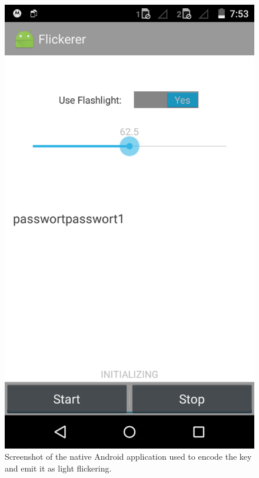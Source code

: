 \documentclass{sig-alternate} %
\begin{document}
\begin{figure}
	\centering
	\includegraphics[scale=.15]{images/screen_native.png}
	\caption{Screenshot of the native Android application used to encode the key and emit it as light flickering.}
	\label{fig:screenshot}
\end{figure}

\end{document}
